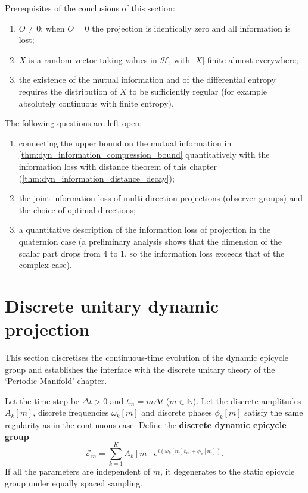 \begin{remark}\label{rem:dyn_projection_info_scope}
Prerequisites of the conclusions of this section:
\begin{enumerate}[label=(\roman*)]
    \item $O\neq 0$; when $O=0$ the projection is identically zero and all information is lost;
    \item $X$ is a random vector taking values in $\mathcal H$, with $|X|$ finite almost everywhere;
    \item the existence of the mutual information and of the differential entropy requires the distribution of $X$ to be sufficiently regular (for example absolutely continuous with finite entropy).
\end{enumerate}
The following questions are left open:
\begin{enumerate}[label=(\alph*)]
    \item connecting the upper bound on the mutual information in \cref{thm:dyn_information_compression_bound} quantitatively with the information loss with distance theorem of this chapter (\cref{thm:dyn_information_distance_decay});
    \item the joint information loss of multi-direction projections (observer groups) and the choice of optimal directions;
    \item a quantitative description of the information loss of projection in the quaternion case (a preliminary analysis shows that the dimension of the scalar part drops from $4$ to $1$, so the information loss exceeds that of the complex case).
\end{enumerate}
\end{remark}

\section{Discrete unitary dynamic projection}
\label{sec:dyn_discrete_unitary}

This section discretises the continuous-time evolution of the dynamic epicycle group and establishes the interface with the discrete unitary theory of the `Periodic Manifold' chapter.

\begin{definition}\label{def:dyn_discrete_epicycle}
Let the time step be $\Delta t>0$ and $t_m=m\Delta t$ ($m\in\mathbb N$). Let the discrete amplitudes $A_k[m]$, discrete frequencies $\omega_k[m]$ and discrete phases $\phi_k[m]$ satisfy the same regularity as in the continuous case. Define the \textbf{discrete dynamic epicycle group}
\[
\mathcal E_m=\sum_{k=1}^{K}A_k[m]\,e^{i(\omega_k[m]t_m+\phi_k[m])}.
\]
If all the parameters are independent of $m$, it degenerates to the static epicycle group under equally spaced sampling.
\end{definition}

